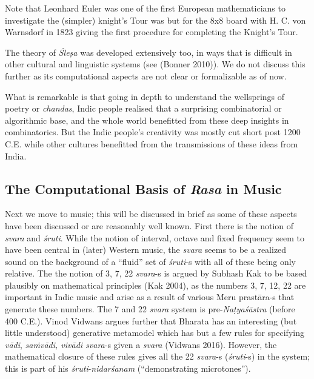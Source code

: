Note that Leonhard Euler was one of the first European mathematicians to investigate the (simpler) knight’s Tour was but for the 8x8 board with H. C. von Warnsdorf in 1823 giving the first procedure for completing the Knight's Tour.

The theory of \textsl{Śleṣa} was developed extensively too, in ways that is difficult in other cultural and linguistic systems (see (Bonner 2010)). We do not discuss this further as its computational aspects are not clear or formalizable as of now.

What is remarkable is that going in depth to understand the wellsprings of poetry or \textsl{chandas},  Indic people realised that a surprising combinatorial or algorithmic base, and the whole world benefitted from these deep insights in combinatorics. But the Indic people’s creativity was mostly cut short post 1200 C.E. while other cultures benefitted from the transmissions of these ideas from India.

\subsection{The Computational Basis of \textsl{Rasa} in Music}\label{chap3-sec5.2}

Next we move to music; this will be discussed in brief as some of these aspects have been discussed or are reasonably well known. First there is the notion of \textsl{svara} and \textsl{śruti}. While the notion of interval, octave and fixed frequency seem to have been central in (later) Western music, the \textsl{svara} seems to be a realized sound on the background of a “fluid” set of \textsl{śruti}-s with all of these being only relative. The the notion of 3, 7, 22 \textsl{svara}-s is argued by Subhash Kak to be based plausibly on mathematical principles (Kak 2004), as the numbers 3, 7, 12, 22 are important in Indic music and arise as a result of various Meru prastāra-s that generate these numbers. The 7 and 22 \textsl{svara} system is pre-\textsl{Naṭyaśāstra} (before 400 C.E.). Vinod Vidwans argues further that Bharata has an interesting (but little understood) generative metamodel which has but  a few rules for specifying \textsl{vādi}, \textsl{saṁvādi, vivādi svara}-s given a \textsl{svara} (Vidwans 2016). However, the mathematical closure of these rules gives all the 22 \textsl{svara}-s (\textsl{śruti}-s) in the system; this is part of his \textsl{śruti}-\textsl{nidarśanam} (“demonstrating microtones”).

